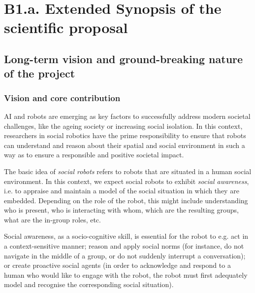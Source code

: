 
\newrefsection


\chapter{B1.a. Extended Synopsis of the scientific proposal}\label{part1}



\section{Long-term vision and ground-breaking nature of the project}

\subsection{Vision and core contribution}

AI and robots are emerging as key factors to successfully address modern societal
challenges, like the ageing society or increasing social isolation. In this
context, researchers in social robotics have the prime responsibility to ensure
that robots can understand and reason about their spatial and social environment
in such a way as to ensure a responsible and positive societal impact.

The basic idea of \emph{social robots} refers to robots that are situated in a
human social environment. In this context, we expect social robots to exhibit
\emph{social awareness}, i.e. to appraise and maintain a model of the social
situation in which they are embedded. Depending on the role of the robot, this
might include understanding who is present, who is interacting with whom, which
are the resulting groups,  what are the in-group roles,  etc.

Social awareness, as a socio-cognitive skill, is essential for the robot to e.g.
act in a context-sensitive manner; reason and apply social norms (for instance,
do not navigate in the middle of a group, or do not suddenly interrupt a
conversation); or create proactive social agents (in order to acknowledge and
respond to a human who would like to engage with the robot, the robot must first
adequately model and recognise the corresponding social situation).


